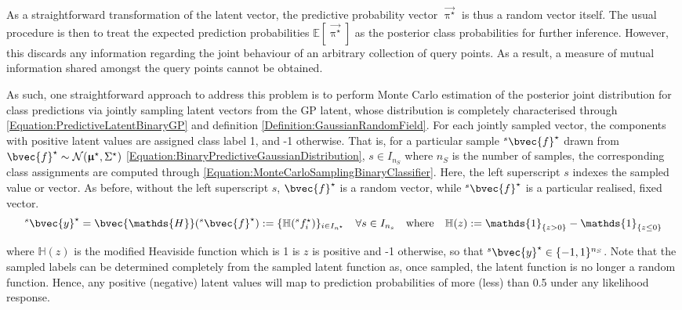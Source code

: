 			As a straightforward transformation of the latent vector, the predictive probability vector $\vec{\uppi^{\star}}$ is thus a random vector itself. The usual procedure is then to treat the expected prediction probabilities $\mathbb{E}[\vec{\uppi^{\star}}]$ as the posterior class probabilities for further inference. However, this discards any information regarding the joint behaviour of an arbitrary collection of query points. As a result, a measure of mutual information shared amongst the query points cannot be obtained.
			
			As such, one straightforward approach to address this problem is to perform Monte Carlo estimation of the posterior joint distribution for class predictions via jointly sampling latent vectors from the GP latent, whose distribution is completely characterised through \eqref{Equation:PredictiveLatentBinaryGP} and definition \ref{Definition:GaussianRandomField}. For each jointly sampled vector, the components with positive latent values are assigned class label 1, and -1 otherwise. That is, for a particular sample ${^{s}}\bvec{f}^{\star}$ drawn from $\bvec{f}^{\star} \sim \mathcal{N}(\vec{\upmu}^{\star}, \Sigma^{\star})$ \eqref{Equation:BinaryPredictiveGaussianDistribution}, $s \in I_{n_{S}}$ where $n_{S}$ is the number of samples, the corresponding class assignments are computed through \eqref{Equation:MonteCarloSamplingBinaryClassifier}. Here, the left superscript $s$ indexes the sampled value or vector. As before, without the left superscript $s$, $\bvec{f}^{\star}$ is a random vector, while ${^{s}}\bvec{f}^{\star}$ is a particular realised, fixed vector. \begin{equation}
				{^{s}}\bvec{y}^{\star} = \bvec{\mathds{H}}({^{s}}\bvec{f}^{\star}) := \{\mathbb{H}({^{s}}f^{\star}_{i})\}_{i \in I_{n^{\star}}} \quad \forall s \in I_{n_{s}} \quad \mathrm{where} \quad \mathbb{H}(z) := \mathds{1}_{\{z > 0\}} - \mathds{1}_{\{z \leq 0\}}
			\label{Equation:MonteCarloSamplingBinaryClassifier}
			\end{equation}
			
			where $\mathbb{H}(z)$ is the modified Heaviside function which is 1 is $z$ is positive and -1 otherwise, so that ${^{s}}\bvec{y}^{\star} \in \{-1, 1\}^{n_{S}}$. Note that the sampled labels can be determined completely from the sampled latent function as, once sampled, the latent function is no longer a random function. Hence, any positive (negative) latent values will map to prediction probabilities of more (less) than 0.5 under any likelihood response.
			
